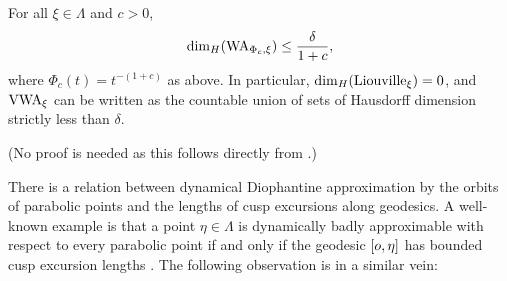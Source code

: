\begin{theorem}
\label{theoremFSUjarnik}
For all $\xi\in\Lambda$ and $c > 0$,
\[
{\dim_H}(\mathrm{WA}_{\Phi_c,\xi}) \leq \frac{\delta}{1 + c},
\]
where $\Phi_c(t) = t^{-(1 + c)}$ as above. In particular, ${\dim_H}(\mathrm{Liouville}_\xi) = 0$, and $\mathrm{VWA}_\xi$ can be written as the countable union of sets of Hausdorff dimension strictly less than $\delta$.
\end{theorem}
\noindent (No proof is needed as this follows directly from \cite[Theorem 7.1]{FSU4}.)

There is a relation between dynamical Diophantine approximation by the orbits of parabolic points and the lengths of cusp excursions along geodesics. A well-known example is that a point $\eta\in\Lambda$ is dynamically badly approximable with respect to every parabolic point if and only if the geodesic $[o,\eta]$ has bounded cusp excursion lengths \cite[Proposition 1.21]{FSU4}. The following observation is in a similar vein:

